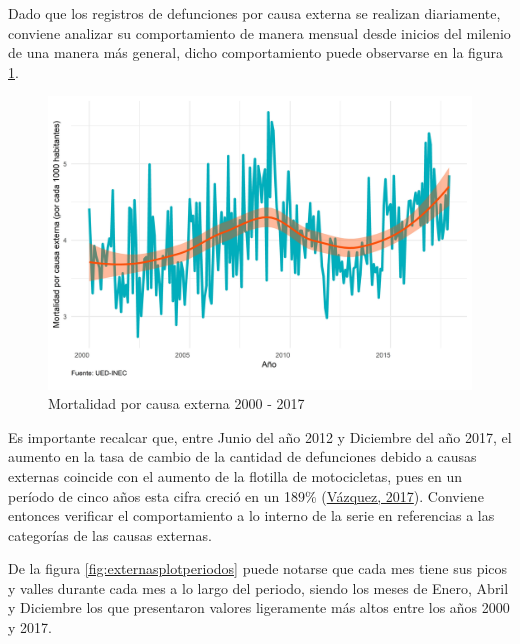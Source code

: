 \documentclass[
]{article}
\begin{document}
Dado que los registros de defunciones por causa externa se realizan
diariamente, conviene analizar su comportamiento de manera mensual desde
inicios del milenio de una manera más general, dicho comportamiento
puede observarse en la figura \ref{fig:externaplotgeneral}.

\begin{figure}[!h]
\includegraphics[width=1\linewidth,height=1\textheight]{Tesis_files/figure-latex/externaplotgeneral-1} \caption{Mortalidad por causa externa 2000 - 2017}\label{fig:externaplotgeneral}
\end{figure}

Es importante recalcar que, entre Junio del año 2012 y Diciembre del año
2017, el aumento en la tasa de cambio de la cantidad de defunciones
debido a causas externas coincide con el aumento de la flotilla de
motocicletas, pues en un período de cinco años esta cifra creció en un
189\% (\protect\hyperlink{ref-motos}{Vázquez, 2017}). Conviene entonces
verificar el comportamiento a lo interno de la serie en referencias a
las categorías de las causas externas.

De la figura \ref{fig:externasplotperiodos} puede notarse que cada mes
tiene sus picos y valles durante cada mes a lo largo del periodo, siendo
los meses de Enero, Abril y Diciembre los que presentaron valores
ligeramente más altos entre los años 2000 y 2017.
\end{document}
